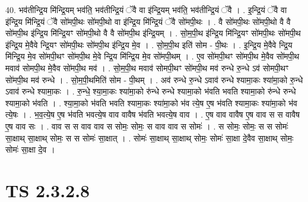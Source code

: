 \documentclass[17pt]{extarticle}
\begin{document}
40. भव॑तीन्द्रि॒य मि॑न्द्रि॒यम् भव॑ति॒ भव॑तीन्द्रि॒यं ॅवै वा इ॑न्द्रि॒यम् भव॑ति॒ भव॑तीन्द्रि॒यं ॅवै । . इ॒न्द्रि॒यं ॅवै वा इ॑न्द्रि॒य मि॑न्द्रि॒यं ॅवै सो॑मपी॒थः सो॑मपी॒थो वा इ॑न्द्रि॒य मि॑न्द्रि॒यं ॅवै सो॑मपी॒थः । . वै सो॑मपी॒थः सो॑मपी॒थो वै वै सो॑मपी॒थ इ॑न्द्रि॒य मि॑न्द्रि॒यꣳ सो॑मपी॒थो वै वै सो॑मपी॒थ इ॑न्द्रि॒यम् । . सो॒म॒पी॒थ इ॑न्द्रि॒य मि॑न्द्रि॒यꣳ सो॑मपी॒थः सो॑मपी॒थ इ॑न्द्रि॒य मे॒वैवे न्द्रि॒यꣳ सो॑मपी॒थः सो॑मपी॒थ इ॑न्द्रि॒य मे॒व । . सो॒म॒पी॒थ इति॑ सोम - पी॒थः । . इ॒न्द्रि॒य मे॒वैवे न्द्रि॒य मि॑न्द्रि॒य मे॒व सो॑मपी॒थꣳ सो॑मपी॒थ मे॒वे न्द्रि॒य मि॑न्द्रि॒य मे॒व सो॑मपी॒थम् । . ए॒व सो॑मपी॒थꣳ सो॑मपी॒थ मे॒वैव सो॑मपी॒थ मवाव॑ सोमपी॒थ मे॒वैव सो॑मपी॒थ मव॑ । . सो॒म॒पी॒थ मवाव॑ सोमपी॒थꣳ सो॑मपी॒थ मव॑ रुन्धे रु॒न्धे ऽव॑ सोमपी॒थꣳ सो॑मपी॒थ मव॑ रुन्धे । . सो॒म॒पी॒थमिति॑ सोम - पी॒थम् । . अव॑ रुन्धे रु॒न्धे ऽवाव॑ रुन्धे श्यामा॒कः श्या॑मा॒को रु॒न्धे ऽवाव॑ रुन्धे श्यामा॒कः । . रु॒न्धे॒ श्या॒मा॒कः श्या॑मा॒को रु॑न्धे रुन्धे श्यामा॒को भ॑वति भवति श्यामा॒को रु॑न्धे रुन्धे श्यामा॒को भ॑वति । . श्या॒मा॒को भ॑वति भवति श्यामा॒कः श्या॑मा॒को भ॑व त्ये॒ष ए॒ष भ॑वति श्यामा॒कः श्या॑मा॒को भ॑व त्ये॒षः । . भ॒व॒त्ये॒ष ए॒ष भ॑वति भवत्ये॒ष वाव वावैष भ॑वति भवत्ये॒ष वाव । . ए॒ष वाव वावैष ए॒ष वाव स स वावैष ए॒ष वाव सः । . वाव स स वाव वाव स सोमः॒ सोमः॒ स वाव वाव स सोमः॑ । . स सोमः॒ सोमः॒ स स सोमः॑ सा॒क्षाथ् सा॒क्षाथ् सोमः॒ स स सोमः॑ सा॒क्षात् । . सोमः॑ सा॒क्षाथ् सा॒क्षाथ् सोमः॒ सोमः॑ सा॒क्षा दे॒वैव सा॒क्षाथ् सोमः॒ सोमः॑ सा॒क्षा दे॒व । \newline
\pagebreak
{}
\section*{ TS 2.3.2.8 }
\end{document}
